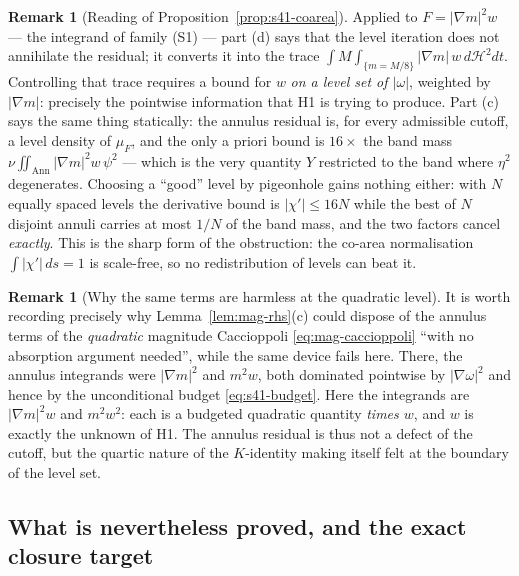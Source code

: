 \documentclass[11pt]{article}
\theoremstyle{definition}
\newtheorem{remark}[theorem]{Remark}
\theoremstyle{remark}
\begin{document}
\begin{remark}[Reading of Proposition~\ref{prop:s41-coarea}]
  \label{rem:s41-reading}
  Applied to $F=|\nabla m|^2w$ --- the integrand of family (S1) --- part (d)
  says that the level iteration does not annihilate the residual; it
  converts it into the trace
  $\int M\!\int_{\{m=M/8\}}|\nabla m|\,w\,d\mathcal{H}^2dt$. Controlling
  that trace requires a bound for $w$ \emph{on a level set of $|\omega|$},
  weighted by $|\nabla m|$: precisely the pointwise information that H1 is
  trying to produce. Part (c) says the same thing statically: the annulus
  residual is, for every admissible cutoff, a level density of $\mu_F$,
  and the only a priori bound is $16\times$ the band mass
  $\nu\iint_{\mathrm{Ann}}|\nabla m|^2w\,\psi^2$ --- which is the very
  quantity $Y$ restricted to the band where $\eta^2$ degenerates. Choosing a
  ``good'' level by pigeonhole gains nothing either: with $N$ equally spaced
  levels the derivative bound is $|\chi'|\leq16N$ while the best of $N$
  disjoint annuli carries at most $1/N$ of the band mass, and the two
  factors cancel \emph{exactly}. This is the sharp form of the obstruction:
  the co-area normalisation $\int|\chi'|\,ds=1$ is scale-free, so no
  redistribution of levels can beat it.
\end{remark}

\begin{remark}[Why the same terms are harmless at the quadratic level]
  \label{rem:s41-contrast}
  It is worth recording precisely why Lemma~\ref{lem:mag-rhs}(c) could
  dispose of the annulus terms of the \emph{quadratic} magnitude Caccioppoli
  \eqref{eq:mag-caccioppoli} ``with no absorption argument needed'', while
  the same device fails here. There, the annulus integrands were
  $|\nabla m|^2$ and $m^2w$, both dominated pointwise by $|\nabla\omega|^2$
  and hence by the unconditional budget \eqref{eq:s41-budget}. Here the
  integrands are $|\nabla m|^2w$ and $m^2w^2$: each is a budgeted quadratic
  quantity \emph{times $w$}, and $w$ is exactly the unknown of H1. The
  annulus residual is thus not a defect of the cutoff, but the quartic
  nature of the $K$-identity making itself felt at the boundary of the
  level set.
\end{remark}

\subsection{What is nevertheless proved, and the exact closure target}
\label{subsec:s41-target}
\end{document}
